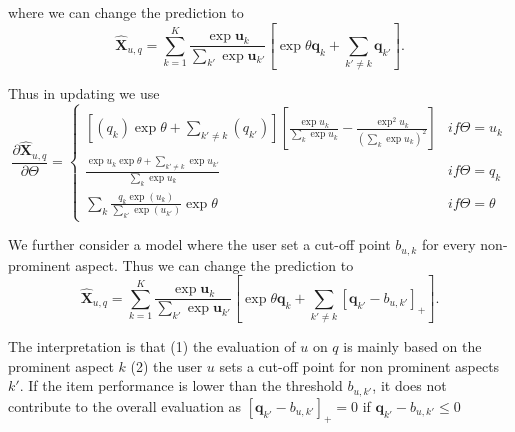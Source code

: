 \documentclass[11pt]{report}
\begin{document}
where we can change the prediction to 
\begin{equation}\label{equ:MF-NCR}
 \hat{\mathbf{X}}_{u,q}=\sum_{k=1}^{K} \frac{\exp \mathbf{u}_k}{\sum_{k'} \exp \mathbf{u}_{k'}} [ \exp\theta \mathbf{q}_k  + \sum_{k'\neq k} \mathbf{q}_{k'} ].
\end{equation}

Thus in updating we use
 \begin{equation}\label{equ:derivative}
 \frac{\partial \hat{\mathbf{X}}_{u,q}}{\partial \Theta}=\left\{\begin{matrix}
 [(q_k) \exp\theta +\sum_{k'\neq k}(q_{k'})][\frac{\exp u_k}{\sum_{k}\exp u_k}-\frac{\exp^2 u_k}{(\sum_k \exp u_k)^2}] & if \Theta=u_k \\ 
\frac{\exp u_k \exp \theta +\sum_{k'\neq k} \exp u_{k'}}{\sum_k \exp u_k}  & if \Theta= q_{k}  \\ 
\sum_k  \frac{q_k \exp (u_k)}{\sum_{k'} \exp (u_{k'})} \exp \theta & if \Theta = \theta 
\end{matrix}\right.
\end{equation}

We further consider a model where the user set a cut-off point $b_{u,k}$ for every non-prominent aspect. 
Thus we can change the prediction to 
\begin{equation}\label{equ:MF-NCR}
 \hat{\mathbf{X}}_{u,q}=\sum_{k=1}^{K} \frac{\exp \mathbf{u}_k}{\sum_{k'} \exp \mathbf{u}_{k'}} [ \exp\theta \mathbf{q}_k  + \sum_{k'\neq k} [\mathbf{q}_{k'}-b_{u,k'}]_+ ].
\end{equation}

The interpretation is that (1) the evaluation of $u$ on $q$ is mainly based on the prominent aspect $k$ (2) the user $u$ sets a cut-off point for non prominent aspects $k'$. If the item performance is lower than the threshold $b_{u,k'}$, it does not contribute to the overall evaluation as $[\mathbf{q}_{k'}-b_{u,k'}]_+=0$ if $\mathbf{q}_{k'}-b_{u,k'}\leq 0$
\end{document}
